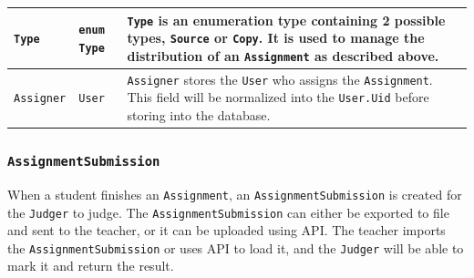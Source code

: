 \documentclass[a4paper]{report}
\begin{document}
\begin{tabulary}{\textwidth}{|l|l|L|}
    \hline
    \texttt{Type} & \texttt{enum Type} & \texttt{Type} is an enumeration type containing 2 possible types, \texttt{Source} or \texttt{Copy}. It is used to manage the distribution of an \texttt{Assignment} as described above. \\
    \hline
    \texttt{Assigner} & \texttt{User} & \texttt{Assigner} stores the \texttt{User} who assigns the \texttt{Assignment}. This field will be normalized into the \texttt{User.Uid} before storing into the database. \\
    \hline
\end{tabulary}

\subsubsection{\texttt{AssignmentSubmission}}

When a student finishes an \texttt{Assignment}, an \texttt{AssignmentSubmission} is created for the \texttt{Judger} to judge. The \texttt{AssignmentSubmission} can either be exported to file and sent to the teacher, or it can be uploaded using API. The teacher imports the \texttt{AssignmentSubmission} or uses API to load it, and the \texttt{Judger} will be able to mark it and return the result.
\end{document}
